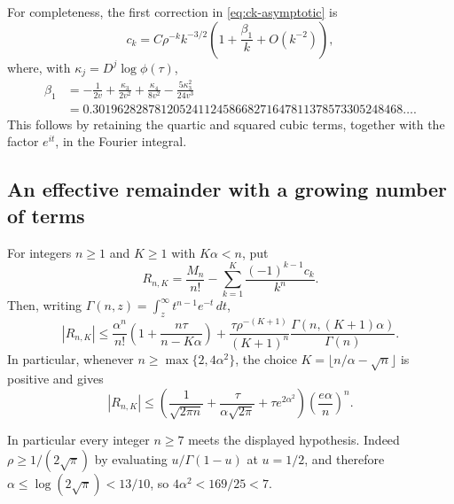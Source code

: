 For completeness, the first correction in \eqref{eq:ck-asymptotic} is
\[
 c_k=C\rho^{-k}k^{-3/2}\left(1+\frac{\beta_1}{k}+O(k^{-2})\right),
\]
where, with $\kappa_j=D^j\log\phi(\tau)$,
\begin{align*}
 \beta_1&=-\frac1{2v}+\frac{\kappa_3}{2v^2}
 +\frac{\kappa_4}{8v^2}-\frac{5\kappa_3^2}{24v^3}
 \\
 &=0.30196282878120524112458668271647811378573305248468\ldots.
\end{align*}
This follows by retaining the quartic and squared cubic terms, together
with the factor $e^{it}$, in the Fourier integral.

\subsection{An effective remainder with a growing number of terms}
\begin{theorem}
\label{thm:effective-moment}
For integers $n\ge1$ and $K\ge1$ with $K\alpha<n$, put
\[
 R_{n,K}=\frac{M_n}{n!}-\sum_{k=1}^{K}\frac{(-1)^{k-1}c_k}{k^n}.
\]
Then, writing $\Gamma(n,z)=\int_z^\infty t^{n-1}e^{-t}\,dt$,
\begin{equation}
 |R_{n,K}|\le
 \frac{\alpha^n}{n!}\left(1+\frac{n\tau}{n-K\alpha}\right)
 +\frac{\tau\rho^{-(K+1)}}{(K+1)^n}
   \frac{\Gamma(n,(K+1)\alpha)}{\Gamma(n)}.
 \label{eq:remainder-exact}
\end{equation}
In particular, whenever $n\ge\max\{2,4\alpha^2\}$, the choice
$K=\lfloor n/\alpha-\sqrt n\rfloor$ is positive and gives
\begin{equation}
 |R_{n,K}|\le
 \left(\frac1{\sqrt{2\pi n}}+
       \frac{\tau}{\alpha\sqrt{2\pi}}+
       \tau e^{2\alpha^2}\right)
 \left(\frac{e\alpha}{n}\right)^n.
 \label{eq:remainder-optimized}
\end{equation}
\end{theorem}
In particular every integer $n\ge7$ meets the displayed hypothesis.
Indeed $\rho\ge1/(2\sqrt\pi)$ by evaluating $u/\Gamma(1-u)$
at $u=1/2$, and therefore $\alpha\le\log(2\sqrt\pi)<13/10$,
so $4\alpha^2<169/25<7$.

